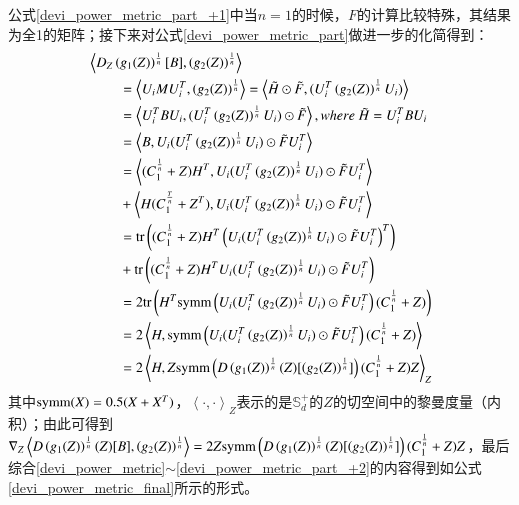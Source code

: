 公式\ref{devi_power_metric_part_+1}中当$n=1$的时候，$F$的计算比较特殊，其结果为全1的矩阵；接下来对公式\ref{devi_power_metric_part}做进一步的化简得到：
\begin{equation}
\label{devi_power_metric_part_+2}
\begin{split}
&\left<D_{Z}\left(g_{1}(Z)\right)^{\frac{1}{n}}[B],\left(g_{2}(Z)\right)^{\frac{1}{n}}\right>\\
&~~~~~~~~~=\left<U_{i}MU_{i}^{T},\left(g_{2}(Z)\right)^{\frac{1}{n}}\right>=\left<\tilde{H}\odot\tilde{F},(U_{i}^{T}\left(g_{2}(Z)\right)^{\frac{1}{n}}U_{i})\right>\\
&~~~~~~~~~=\left<U_{i}^{T}BU_{i},(U_{i}^{T}\left(g_{2}(Z)\right)^{\frac{1}{n}}U_{i})\odot\tilde{F}\right>,where~\tilde{H}=U_{i}^{T}BU_{i}\\
&~~~~~~~~~=\left<B,U_{i}(U_{i}^{T}\left(g_{2}(Z)\right)^{\frac{1}{n}}U_{i})\odot\tilde{F}U_{i}^{T}\right>\\
&~~~~~~~~~=\left<(C_{1}^{\frac{1}{n}}+Z)H^{T},U_{i}(U_{i}^{T}\left(g_{2}(Z)\right)^{\frac{1}{n}}U_{i})\odot\tilde{F}U_{i}^{T}\right>\\
&~~~~~~~~~+\left<H(C_{1}^{\frac{T}{n}}+Z^{T}),U_{i}(U_{i}^{T}\left(g_{2}(Z)\right)^{\frac{1}{n}}U_{i})\odot\tilde{F}U_{i}^{T}\right>\\
&~~~~~~~~~={\rm tr}\left((C_{1}^{\frac{1}{n}}+Z)H^{T}\left(U_{i}(U_{i}^{T}\left(g_{2}(Z)\right)^{\frac{1}{n}}U_{i})\odot\tilde{F}U_{i}^{T}\right)^{T}\right)\\
&~~~~~~~~~+{\rm tr}\left((C_{1}^{\frac{1}{n}}+Z)H^{T}U_{i}(U_{i}^{T}\left(g_{2}(Z)\right)^{\frac{1}{n}}U_{i})\odot\tilde{F}U_{i}^{T}\right)\\
&~~~~~~~~~=2{\rm tr}\left(H^{T}{\rm symm}\left(U_{i}(U_{i}^{T}\left(g_{2}(Z)\right)^{\frac{1}{n}}U_{i})\odot\tilde{F}U_{i}^{T}\right)(C_{1}^{\frac{1}{n}}+Z)\right)\\
&~~~~~~~~~=2\left<H,{\rm symm}\left(U_{i}(U_{i}^{T}\left(g_{2}(Z)\right)^{\frac{1}{n}}U_{i})\odot\tilde{F}U_{i}^{T}\right)(C_{1}^{\frac{1}{n}}+Z)\right>\\
&~~~~~~~~~=2\left<H,Z{\rm symm}\left(D\left(g_{1}(Z)\right)^{\frac{1}{n}}(Z)[\left(g_{2}(Z)\right)^{\frac{1}{n}}]\right)(C_{1}^{\frac{1}{n}}+Z)Z\right>_Z\\
\end{split}
\end{equation}
其中${\rm symm}(X)=0.5(X+X^{T})$，$\left<\cdot,\cdot\right>_Z$表示的是$\mathbb{S}_{d}^{+}$的$Z$的切空间中的黎曼度量（内积）；由此可得到$\nabla_{Z}\left<D\left(g_{1}(Z)\right)^{\frac{1}{n}}(Z)[B],\left(g_{2}(Z)\right)^{\frac{1}{n}}\right>=2Z{\rm symm}\left(D\left(g_{1}(Z)\right)^{\frac{1}{n}}(Z)[\left(g_{2}(Z)\right)^{\frac{1}{n}}]\right)(C_{1}^{\frac{1}{n}}+Z)Z$，最后综合\ref{devi_power_metric}$\sim$\ref{devi_power_metric_part_+2}的内容得到如公式\ref{devi_power_metric_final}所示的形式。
